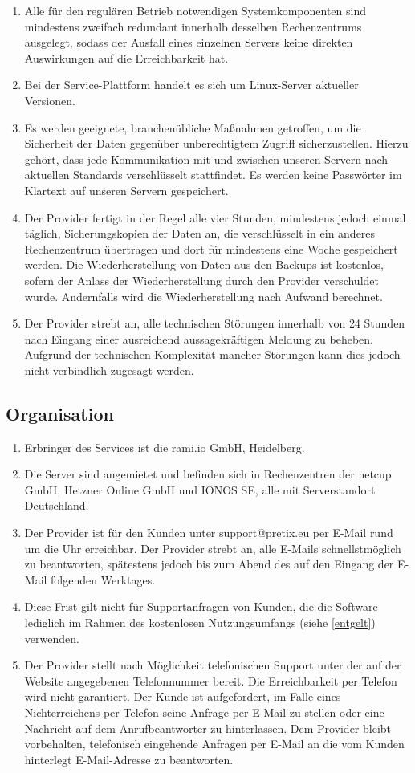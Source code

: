 \documentclass{terms}
\begin{document}
\begin{enumerate}
\item Alle für den regulären Betrieb notwendigen Systemkomponenten sind mindestens zweifach redundant innerhalb desselben Rechenzentrums ausgelegt, sodass der Ausfall eines einzelnen Servers keine direkten Auswirkungen auf die Erreichbarkeit hat.
\item Bei der Service-Plattform handelt es sich um Linux-Server aktueller Versionen.
\item Es werden geeignete, branchenübliche Maßnahmen getroffen, um die Sicherheit der Daten gegenüber unberechtigtem Zugriff sicherzustellen. Hierzu gehört, dass jede Kommunikation mit und zwischen unseren Servern nach aktuellen Standards verschlüsselt stattfindet. Es werden keine Passwörter im Klartext auf unseren Servern gespeichert.
\item Der Provider fertigt in der Regel alle vier Stunden, mindestens jedoch einmal täglich, Sicherungskopien der Daten an, die verschlüsselt in ein anderes Rechenzentrum übertragen und dort für mindestens eine Woche gespeichert werden. Die Wiederherstellung von Daten aus den Backups ist kostenlos, sofern der Anlass der Wiederherstellung durch den Provider verschuldet wurde. Andernfalls wird die Wiederherstellung nach Aufwand berechnet.
\item Der Provider strebt an, alle technischen Störungen innerhalb von 24 Stunden nach Eingang einer ausreichend aussagekräftigen Meldung zu beheben. Aufgrund der technischen Komplexität mancher Störungen kann dies jedoch nicht verbindlich zugesagt werden.
\end{enumerate}

\subsection{Organisation}
\begin{enumerate}
\item Erbringer des Services ist die rami.io GmbH, Heidelberg.
\item Die Server sind angemietet und befinden sich in Rechenzentren der netcup GmbH, Hetzner Online GmbH und IONOS SE, alle mit Serverstandort Deutschland.
\item Der Provider ist für den Kunden unter support@pretix.eu per E-Mail rund um die Uhr erreichbar. Der Provider strebt an, alle E-Mails schnellstmöglich zu beantworten, spätestens jedoch bis zum Abend des auf den Eingang der E-Mail folgenden Werktages.
\item Diese Frist gilt nicht für Supportanfragen von Kunden, die die Software lediglich im Rahmen des kostenlosen Nutzungsumfangs (siehe \ref{entgelt}) verwenden.
\item Der Provider stellt nach Möglichkeit telefonischen Support unter der auf der Website angegebenen Telefonnummer bereit. Die Erreichbarkeit per Telefon wird nicht garantiert. Der Kunde ist aufgefordert, im Falle eines Nichterreichens per Telefon seine Anfrage per E-Mail zu stellen oder eine Nachricht auf dem Anrufbeantworter zu hinterlassen. Dem Provider bleibt vorbehalten, telefonisch eingehende Anfragen per E-Mail an die vom Kunden hinterlegt E-Mail-Adresse zu beantworten.
\end{enumerate}
\end{document}
